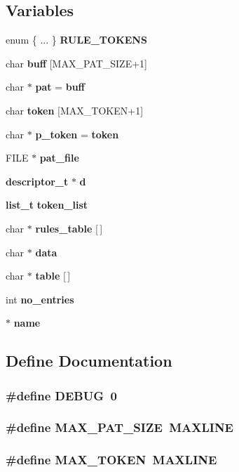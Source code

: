 \subsection*{Variables}
\begin{CompactItemize}
\item 
enum  \{ ... \}  {\bf RULE\_\-TOKENS}
\item 
char {\bf buff} [MAX\_\-PAT\_\-SIZE+1]
\item 
char $\ast$ {\bf pat} = {\bf buff}
\item 
char {\bf token} [MAX\_\-TOKEN+1]
\item 
char $\ast$ {\bf p\_\-token} = {\bf token}
\item 
FILE $\ast$ {\bf pat\_\-file}
\item 
{\bf descriptor\_\-t} $\ast$ {\bf d}
\item 
{\bf list\_\-t} {\bf token\_\-list}
\item 
char $\ast$ {\bf rules\_\-table} [$\,$]
\item 
char $\ast$ {\bf data}
\item 
char $\ast$ {\bf table} [$\,$]
\item 
int {\bf no\_\-entries}
\item 
$\ast$ {\bf name}
\end{CompactItemize}


\subsection{Define Documentation}
\subsubsection{\setlength{\rightskip}{0pt plus 5cm}\#define DEBUG\ 0}\label{P__parser_8c_a0}


\subsubsection{\setlength{\rightskip}{0pt plus 5cm}\#define MAX\_\-PAT\_\-SIZE\ MAXLINE}\label{P__parser_8c_a2}


\subsubsection{\setlength{\rightskip}{0pt plus 5cm}\#define MAX\_\-TOKEN\ MAXLINE}\label{P__parser_8c_a3}


